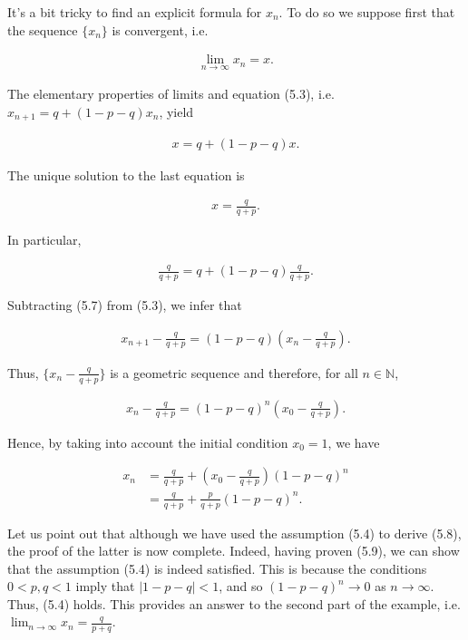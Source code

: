 It's a bit tricky to find an explicit formula for $x_n$. To do so we suppose first that the sequence $\{x_n\}$ is convergent, i.e.

\begin{align}
\lim_{n\to\infty} x_n = x. \tag{5.4}
\end{align}

The elementary properties of limits and equation (5.3), i.e. $x_{n+1} = q + (1-p-q)x_n$, yield

\begin{align}
x = q + (1-p-q)x. \tag{5.5}
\end{align}

The unique solution to the last equation is

\begin{align}
x = \frac{q}{q+p}. \tag{5.6}
\end{align}

In particular,

\begin{align}
\frac{q}{q+p} = q + (1-p-q)\frac{q}{q+p}. \tag{5.7}
\end{align}

Subtracting (5.7) from (5.3), we infer that

\begin{align}
x_{n+1} - \frac{q}{q+p} = (1-p-q)\left(x_n - \frac{q}{q+p}\right). \tag{5.8}
\end{align}

Thus, $\{x_n - \frac{q}{q+p}\}$ is a geometric sequence and therefore, for all $n\in\mathbb{N}$,

\begin{align}
x_n - \frac{q}{q+p} = (1-p-q)^n\left(x_0 - \frac{q}{q+p}\right).
\end{align}

Hence, by taking into account the initial condition $x_0 = 1$, we have

\begin{align}
x_n &= \frac{q}{q+p} + \left(x_0 - \frac{q}{q+p}\right)(1-p-q)^n \tag{5.9} \\
&= \frac{q}{q+p} + \frac{p}{q+p}(1-p-q)^n.
\end{align}

Let us point out that although we have used the assumption (5.4) to derive (5.8), the proof of the latter is now complete. Indeed, having proven (5.9), we can show that the assumption (5.4) is indeed satisfied. This is because the conditions $0 < p, q < 1$ imply that $|1-p-q| < 1$, and so $(1-p-q)^n \to 0$ as $n \to \infty$. Thus, (5.4) holds. This provides an answer to the second part of the example, i.e. $\lim_{n\to\infty} x_n = \frac{q}{p+q}$.

